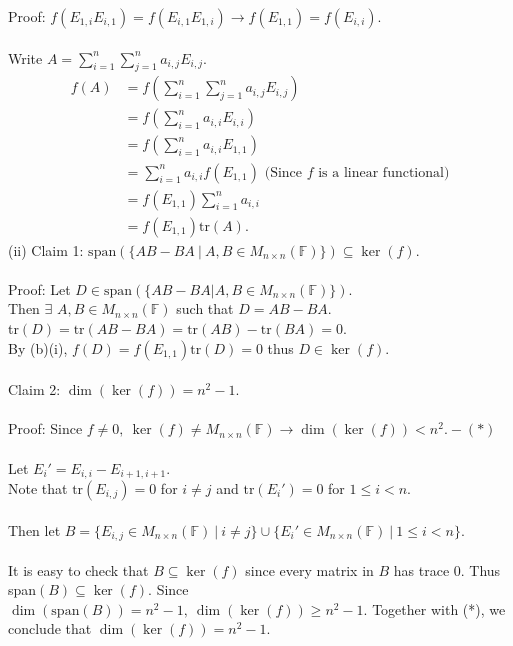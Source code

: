 \documentclass{article}
\begin{document}
Proof: $f(E_{1,i}E_{i,1}) = f(E_{i,1}E_{1,i}) \to f(E_{1,1}) = f(E_{i,i}).$\\\\
Write $A = \sum\limits_{i=1}^n \sum\limits_{j=1}^n a_{i,j}E_{i,j}.$\begin{align*}
f(A) &= f(\sum\limits_{i=1}^n \sum\limits_{j=1}^n a_{i,j}E_{i,j})\\&=f(\sum\limits_{i=1}^n a_{i,i}E_{i,i})\\&=f(\sum\limits_{i=1}^n a_{i,i}E_{1,1})\\&=\sum\limits_{i=1}^n a_{i,i}f(E_{1,1})\text{\ \ (Since $f$ is a linear functional)}\\&= f(E_{1,1})\sum\limits_{i=1}^n a_{i,i}
\\&=f(E_{1,1})\text{tr}(A).\end{align*}
(ii) Claim 1: $\text{span}(\{AB-BA\ |\ A,B\in M_{n\times n}(\mathbb{F})\}) \subseteq \ker(f)$.
\\\\Proof: Let $D \in \text{span}(\{AB-BA|A,B\in M_{n\times n}(\mathbb{F})\})$.\\ Then $\exists$ $A,B\in M_{n\times n}(\mathbb{F})$ such that $D = AB - BA.$\\tr$(D) = \text{tr}(AB-BA) = \text{tr}(AB) - \text{tr}(BA) = 0.$\\By (b)(i), $f(D) = f(E_{1,1})\text{tr}(D) = 0$ thus $D\in \ker(f).$ \\\\
Claim 2: $\dim(\ker(f)) = n^2-1.$\\\\
Proof: Since $f\neq0,\ \ker(f) \neq M_{n\times n}(\mathbb{F}) \to \dim(\ker(f)) < n^2. -(*)$ \\\\
Let $E_i' = E_{i,i} - E_{i+1,i+1}.$\\
Note that $\text{tr}(E_{i,j}) = 0$ for $i \neq j$ and $\text{tr}(E_{i}') = 0$ for $1\leq i < n.$\\\\
Then let $B = \{E_{i,j}\in M_{n\times n} (\mathbb{F})\ |\ i\neq j \}\cup \{E_i' \in M_{n\times n}(\mathbb{F}) \ |\ 1\leq i < n\}.$\\\\
It is easy to check that $B\subseteq \ker(f)$ since every matrix in $B$ has trace 0. Thus span$(B) \subseteq \ker(f).$  Since $\dim(\text{span}(B)) = n^2 -1,\ \dim(\ker(f)) \geq n^2 - 1.$ Together with (*), we conclude that $\dim(\ker(f)) = n^2 -1.$\\\\
\end{document}
